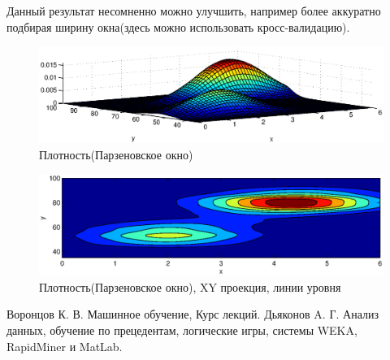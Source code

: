 \documentclass[10pt, a4paper]{article}
\begin{document}
Данный результат несомненно можно улучшить, например более аккуратно подбирая ширину окна(здесь 
можно использовать кросс-валидацию).
\begin{figure}[h]
    \includegraphics[width=\textwidth]{parzenAns.eps}
    \caption{Плотность(Парзеновское окно)}
    \label{ParzenAns}
\end{figure}
\begin{figure}[h]
    \includegraphics[width=\textwidth]{parzenAnsXY.eps}
    \caption{Плотность(Парзеновское окно), XY проекция, линии уровня}
    \label{ParzenAnsXY}
\end{figure}


\clearpage
\begin{thebibliography}{99}
    Воронцов К. В. Машинное обучение, Курс лекций.
    Дьяконов A. Г. Анализ данных, обучение по прецедентам, логические игры, системы WEKA, RapidMiner и MatLab.
\end{thebibliography}
\end{document}
